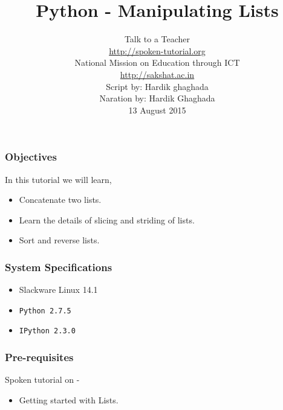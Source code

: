 \documentclass[17pt,compress]{beamer}
\author[FOSSEE]{}
\institute[IIT Bombay]{}
\date[]{}
\begin{document}
\sffamily \bfseries
\title
[Manipulating Lists]
{Python - Manipulating Lists}
\author
[FOSSEE, IIT - Bombay]
{\small Talk to a Teacher\\{\color{blue}\url{http://spoken-tutorial.org}}\\National Mission on Education
 through ICT\\{\color{blue}\url{http://sakshat.ac.in}} \\[0.5cm]{\tiny Script by: Hardik ghaghada \\ Naration by: Hardik Ghaghada \\ 13 August 2015}}

\begin{frame}
   \titlepage
\end{frame}
\begin{frame}
\frametitle{Objectives}
\label{sec-2}

  In this tutorial we will learn, \pause


\begin{itemize}
\item Concatenate two lists.\pause
\item Learn the details of slicing and striding of lists.\pause
\item Sort and reverse lists.
\end{itemize}
\end{frame}
\begin{frame}
\frametitle{System Specifications}\pause
\begin{itemize}
\item Slackware Linux 14.1\pause
\item \texttt{Python 2.7.5} \pause
\item \texttt{IPython 2.3.0}
\end{itemize}
\end{frame}
\begin{frame}
\frametitle{Pre-requisites}
\label{sec-3}

Spoken tutorial on -

\begin{itemize}
\item Getting started with Lists.
\end{itemize}
\end{frame}
\end{document}
